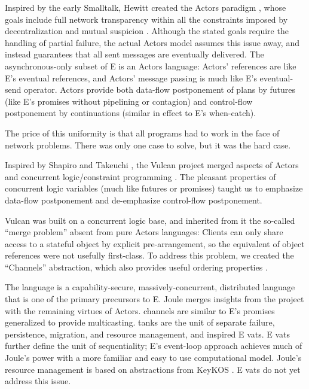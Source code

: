 \documentclass{llncs}
\begin{document}
 Inspired by the early Smalltalk, Hewitt created the
Actors paradigm \cite{hewitt:actors}, whose goals include full network
transparency within all the constraints imposed by decentralization
and mutual suspicion \cite{hewitt:challenge}. Although the stated
goals require the handling of partial failure, the actual Actors model
assumes this issue away, and instead guarantees that all sent messages
are eventually delivered. The asynchronous-only subset of E is an
Actors language: Actors' references are like E's eventual references,
and Actors' message passing is much like E's eventual-send
operator. Actors provide both data-flow postponement of plans by
futures (like E's promises without pipelining or contagion) and
control-flow postponement by continuations (similar in effect to E's
when-catch).

The price of this uniformity is that all programs had to work
in the face of network problems. There was only one case to solve, but
it was the hard case.

 Inspired by Shapiro and Takeuchi \cite{udi:objects},
the Vulcan project \cite{kahn:vulcan} merged aspects of Actors and
concurrent logic/constraint programming \cite{tr003,Saraswat93}. The
pleasant properties of concurrent logic variables (much like futures
or promises) taught us to emphasize data-flow postponement and
de-emphasize control-flow postponement.

Vulcan was built on a concurrent logic base, and inherited from 
it the so-called ``merge problem'' \cite{Shapiro:merge} absent from
pure Actors languages: Clients can only share access to a stateful
object by explicit pre-arrangement, so the equivalent of object
references were not usefully first-class. To address this problem, we
created the ``Channels'' abstraction, which also provides useful
ordering properties \cite{tribble:channels}.

 The  language \cite{tribble:joule} is a
capability-secure, massively-concurrent, distributed language that is
one of the primary precursors to E. Joule merges insights from the
 project with the remaining virtues of Actors. 
channels are similar to E's promises generalized to provide
multicasting.  tanks are the unit of separate failure,
persistence, migration, and resource management, and inspired E vats.
E vats further define the unit of sequentiality; E's event-loop
approach achieves much of Joule's power with a more familiar and easy
to use computational model. Joule's resource management is based on
abstractions from KeyKOS \cite{hardy:keykos}. E vats do not yet
address this issue.
\end{document}
